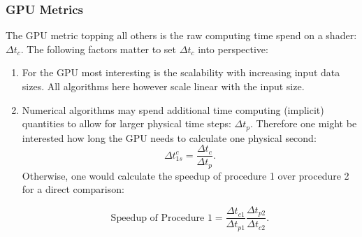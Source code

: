 \documentclass[m,times]{cgMA}
\begin{document}
\subsubsection{GPU Metrics}\label{sec:metrics}
The GPU metric topping all others is the raw computing time spend on a shader: $\Delta t_c$. The following factors matter to set $\Delta t_c$ into perspective:
\begin{enumerate}
  \item For the GPU most interesting is the scalability with increasing input data sizes. All algorithms here however scale linear with the input size.
  \item \label{it:speedup}Numerical algorithms may spend additional time computing (implicit) quantities to allow for larger physical time steps: $\Delta t_p$. Therefore one might be interested how long the GPU needs to calculate one physical second:
    \begin{equation}
    \Delta t^c_{1s} = \frac{\Delta t_c}{\Delta t_p}.
    \end{equation}
    Otherwise, one would calculate the speedup of procedure 1 over procedure 2 for a direct comparison:

    \begin{equation}
      \text{Speedup of Procedure 1} = \frac{\Delta t_{c1}}{\Delta t_{p1}} \frac{\Delta t_{p2}}{\Delta t_{c2}}.
    \end{equation}
\end{enumerate}
\end{document}
